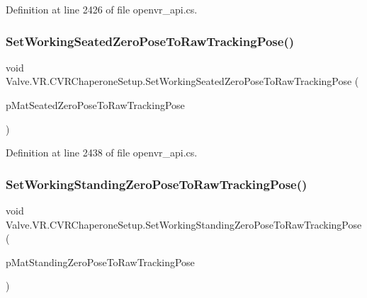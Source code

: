 Definition at line 2426 of file openvr\+\_\+api.\+cs.

\mbox{\label{class_valve_1_1_v_r_1_1_c_v_r_chaperone_setup_a4528ef252f374d951ba173d412dec0d8}} 
\subsubsection{\texorpdfstring{SetWorkingSeatedZeroPoseToRawTrackingPose()}{SetWorkingSeatedZeroPoseToRawTrackingPose()}}
{\footnotesize\ttfamily void Valve.\+V\+R.\+C\+V\+R\+Chaperone\+Setup.\+Set\+Working\+Seated\+Zero\+Pose\+To\+Raw\+Tracking\+Pose (\begin{DoxyParamCaption}\item[{ref \mbox{\hyperlink{struct_valve_1_1_v_r_1_1_hmd_matrix34__t}{Hmd\+Matrix34\+\_\+t}}}]{p\+Mat\+Seated\+Zero\+Pose\+To\+Raw\+Tracking\+Pose }\end{DoxyParamCaption})}



Definition at line 2438 of file openvr\+\_\+api.\+cs.

\mbox{\label{class_valve_1_1_v_r_1_1_c_v_r_chaperone_setup_a6d7f95d19b799168a2462cf1c5b25550}} 
\subsubsection{\texorpdfstring{SetWorkingStandingZeroPoseToRawTrackingPose()}{SetWorkingStandingZeroPoseToRawTrackingPose()}}
{\footnotesize\ttfamily void Valve.\+V\+R.\+C\+V\+R\+Chaperone\+Setup.\+Set\+Working\+Standing\+Zero\+Pose\+To\+Raw\+Tracking\+Pose (\begin{DoxyParamCaption}\item[{ref \mbox{\hyperlink{struct_valve_1_1_v_r_1_1_hmd_matrix34__t}{Hmd\+Matrix34\+\_\+t}}}]{p\+Mat\+Standing\+Zero\+Pose\+To\+Raw\+Tracking\+Pose }\end{DoxyParamCaption})}




